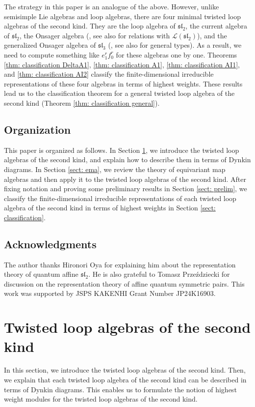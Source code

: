 \documentclass[12pt,a4paper]{amsart}
\theoremstyle{definition}
\numberwithin{equation}{subsection}
\begin{document}
The strategy in this paper is an analogue of the above.
However, unlike semisimple Lie algebras and loop algebras, there are four minimal twisted loop algebras of the second kind.
They are the loop algebra of $\mathfrak{sl}_2$, the current algebra of $\mathfrak{sl}_2$, the Onsager algebra (\cite{Ons44}, see also \cite{Roa91} for relations with $\mathcal{L}(\mathfrak{sl}_2)$), and the generalized Onsager algebra of $\mathfrak{sl}_3$ (\cite{UgIv96}, see also \cite{Sto20} for general types).
As a result, we need to compute something like $e_1^r f_0^r$ for these algebras one by one.
Theorems \ref{thm: classification DeltaA1}, \ref{thm: classification A1}, \ref{thm: classification AI1}, and \ref{thm: classification AI2} classify the finite-dimensional irreducible representations of these four algebras in terms of highest weights.
These results lead us to the classification theorem for a general twisted loop algebra of the second kind (Theorem \ref{thm: classification general}).

\subsection{Organization}
This paper is organized as follows.
In Section \ref{sect: tla2}, we introduce the twisted loop algebras of the second kind, and explain how to describe them in terms of Dynkin diagrams.
In Section \ref{sect: ema}, we review the theory of equivariant map algebras and then apply it to the twisted loop algebras of the second kind.
After fixing notation and proving some preliminary results in Section \ref{sect: prelim}, we classify the finite-dimensional irreducible representations of each twisted loop algebra of the second kind in terms of highest weights in Section \ref{sect: classification}.


\subsection*{Acknowledgments}
The author thanks Hironori Oya for explaining him about the representation theory of quantum affine $\mathfrak{sl}_2$.
He is also grateful to Tomasz Prze\'{z}dziecki for discussion on the representation theory of affine quantum symmetric pairs.
This work was supported by JSPS KAKENHI Grant Number JP24K16903.


\section{Twisted loop algebras of the second kind}\label{sect: tla2}
In this section, we introduce the twisted loop algebras of the second kind.
Then, we explain that each twisted loop algebra of the second kind can be described in terms of Dynkin diagrams.
This enables us to formulate the notion of highest weight modules for the twisted loop algebras of the second kind.
\end{document}
